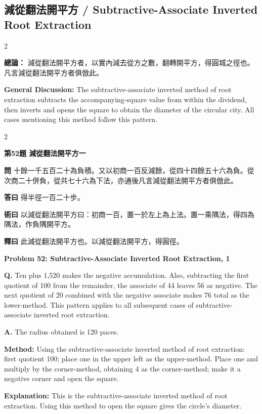 \documentclass[11pt,a4paper]{article}
\newcommand{\wen}[1]{\noindent\textbf{問} #1\par\smallskip}
\newcommand{\da}[1]{\noindent\textbf{答曰} #1\par\smallskip}
\newcommand{\shu}[1]{\noindent\textbf{術曰} #1\par\smallskip}
\newcommand{\shi}[1]{\noindent\textbf{釋曰} #1\par\smallskip}
\newcommand{\wenE}[1]{\noindent\textbf{Q.} #1\par\smallskip}
\newcommand{\daE}[1]{\noindent\textbf{A.} #1\par\smallskip}
\newcommand{\shuE}[1]{\noindent\textbf{Method:} #1\par\smallskip}
\newcommand{\shiE}[1]{\noindent\textbf{Explanation:} #1\par\smallskip}
\begin{document}
\clearpage

\subsection*{減從翻法開平方 / Subtractive-Associate Inverted Root Extraction}

\begin{paracol}{2}

\noindent\textbf{總論：} 減從翻法開平方者，以實內減去從方之數，翻轉開平方，得圓城之徑也。凡言減從翻法開平方者俱倣此。

\switchcolumn

\noindent\textbf{General Discussion:} The subtractive-associate inverted method of root extraction subtracts the accompanying-square value from within the dividend, then inverts and opens the square to obtain the diameter of the circular city. All cases mentioning this method follow this pattern.

\end{paracol}

\bigskip

\begin{paracol}{2}

\noindent\textbf{第52題 減從翻法開平方一}

\wen{十餘一千五百二十為負積。又以初商一百反減餘，從四十四餘五十六為負。從次商二十併負，從共七十六為下法，亦通後凡言減從翻法開平方者俱倣此。}
\da{得半徑一百二十步。}
\shu{以減從翻法開平方曰：初商一百，置一於左上為上法。置一乘隅法，得四為隅法，作負隅開平方。}
\shi{此減從翻法開平方也。以減從翻法開平方，得圓徑。}

\switchcolumn

\noindent\textbf{Problem 52: Subtractive-Associate Inverted Root Extraction, 1}

\wenE{Ten plus 1,520 makes the negative accumulation. Also, subtracting the first quotient of 100 from the remainder, the associate of 44 leaves 56 as negative. The next quotient of 20 combined with the negative associate makes 76 total as the lower-method. This pattern applies to all subsequent cases of subtractive-associate inverted root extraction.}
\daE{The radius obtained is 120 paces.}
\shuE{Using the subtractive-associate inverted method of root extraction: first quotient 100; place one in the upper left as the upper-method. Place one and multiply by the corner-method, obtaining 4 as the corner-method; make it a negative corner and open the square.}
\shiE{This is the subtractive-associate inverted method of root extraction. Using this method to open the square gives the circle's diameter.}

\end{paracol}
\end{document}

